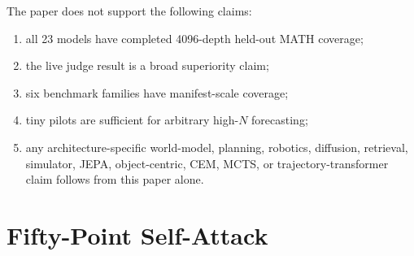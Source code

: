The paper does not support the following claims:
\begin{enumerate}[leftmargin=*]
\item all 23 models have completed 4096-depth held-out MATH coverage;
\item the live judge result is a broad superiority claim;
\item six benchmark families have manifest-scale coverage;
\item tiny pilots are sufficient for arbitrary high-$N$ forecasting;
\item any architecture-specific world-model, planning, robotics, diffusion,
retrieval, simulator, JEPA, object-centric, CEM, MCTS, or trajectory-transformer
claim follows from this paper alone.
\end{enumerate}

\section{Fifty-Point Self-Attack}
\label{app:self-attack}

